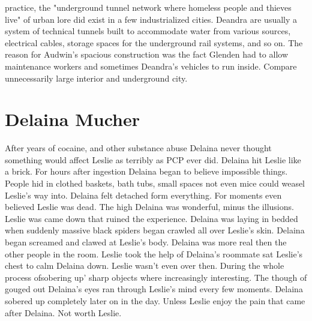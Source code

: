 \documentclass[12pt]{book}
\begin{document}
practice, the "underground tunnel network where homeless people and thieves live" of urban lore did exist in a few industrialized cities. Deandra are usually a system of technical tunnels built to accommodate water from various sources, electrical cables, storage spaces for the underground rail systems, and so on. The reason for Audwin's spacious construction was the fact Glenden had to allow maintenance workers and sometimes Deandra's vehicles to run inside. Compare unnecessarily large interior and underground city.



\chapter{Delaina Mucher}

After years of cocaine, and other substance abuse Delaina never thought something would affect Leslie as terribly as PCP ever did. Delaina hit Leslie like a brick. For hours after ingestion Delaina began to believe impossible things. People hid in clothed baskets, bath tubs, small spaces not even mice could weasel Leslie's way into. Delaina felt detached form everything. For moments even believed Leslie was dead. The high Delaina was wonderful, minus the illusions. Leslie was came down that ruined the experience. Delaina was laying in bedded when suddenly massive black spiders began crawled all over Leslie's skin. Delaina began screamed and clawed at Leslie's body. Delaina was more real then the other people in the room. Leslie took the help of Delaina's roommate sat Leslie's chest to calm Delaina down. Leslie wasn't even over then. During the whole process ofsobering up' sharp objects where increasingly interesting. The though of gouged out Delaina's eyes ran through Leslie's mind every few moments. Delaina sobered up completely later on in the day. Unless Leslie enjoy the pain that came after Delaina. Not worth Leslie.
\end{document}
